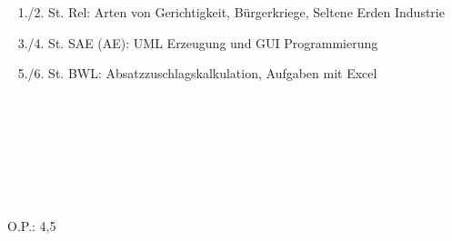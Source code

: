 {{	\textbullet~ 1./2. St. Rel: Arten von Gerichtigkeit, Bürgerkriege, Seltene Erden Industrie\par
	\textbullet~ 3./4. St. SAE (AE): UML Erzeugung und GUI Programmierung\par
	\textbullet~ 5./6. St. BWL: Absatzzuschlagskalkulation, Aufgaben mit Excel\par
	\textbullet~ \par
	\textbullet~ \par
	\textbullet~ \par
	\textbullet~ 
	}{}{O.P.: 4,5}
}{}
\Unterschrift
\newpage

